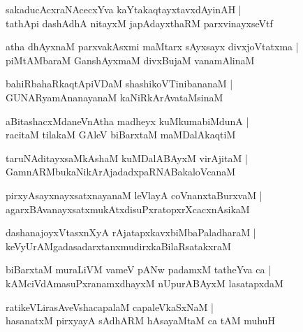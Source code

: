 \documentclass[twoside,12pt,openright]{book}
\newcounter{shloka}[chapter]
\begin{document}
\begin{shloka}%
sakaducAcxraNAcecxYva kaYtakaqtayxtavxdAyinAH |\\
tathApi dashAdhA nitayxM japAdayxthaRM parxvinayxseVtf 
\end{shloka}

\begin{shloka}%
atha dhAyxnaM parxvakAsxmi maMtarx sAyxsayx divxjoVtatxma |\\
piMtAMbaraM GanshAyxmaM divxBujaM vanamAlinaM 
\end{shloka}

\begin{shloka}%
bahiRbahaRkaqtApiVDaM shashikoVTinibananaM |\\
GUNARyamAnanayanaM kaNiRkArAvataMsinaM 
\end{shloka}

\begin{shloka}%
aBitashacxMdaneVnAtha madheyx kuMkumabiMdunA |\\
racitaM tilakaM GAleV biBarxtaM maMDalAkaqtiM 
\end{shloka}

\begin{shloka}%
taruNAditayxsaMkAshaM kuMDalABAyxM virAjitaM |\\
GamnARMbukaNikArAjadadxpaRNABakaloVcanaM 
\end{shloka}

\begin{shloka}%
pirxyAsayxnayxsatxnayanaM leVlayA coVnanxtaBurxvaM |\\
agarxBAvanayxsatxmukAtxdisuPxratopxrXcacxnAsikaM 
\end{shloka}

\begin{shloka}%
dashanajoyxVtasxnXyA rAjatapxkavxbiMbaPaladharaM |\\
keVyUrAMgadasadarxtanxmudirxkaBilaRsatakxraM 
\end{shloka}

\begin{shloka}%
biBarxtaM muraLiVM vameV pANw padamxM tatheYva ca |\\
kAMciVdAmasuPxranamxdhayxM nUpurABAyxM lasatapxdaM 
\end{shloka}

\begin{shloka}%
ratikeVLirasAveVshacapalaM capaleVkaSxNaM |\\
hasanatxM pirxyayA sAdhARM hAsayaMtaM ca tAM muhuH
\end{shloka}
\end{document}
